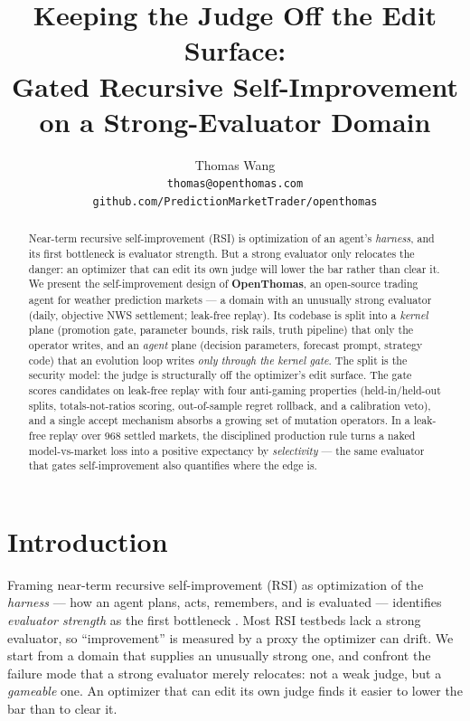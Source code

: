 \documentclass{article}
\title{Keeping the Judge Off the Edit Surface:\\ Gated Recursive
Self-Improvement on a Strong-Evaluator Domain}
\author{%
  Thomas Wang \\
  \texttt{thomas@openthomas.com} \\
  \texttt{github.com/PredictionMarketTrader/openthomas}
}
\begin{document}
\maketitle

\begin{abstract}
Near-term recursive self-improvement (RSI) is optimization of an agent's
\emph{harness}, and its first bottleneck is evaluator strength. But a strong
evaluator only relocates the danger: an optimizer that can edit its own judge
will lower the bar rather than clear it. We present the self-improvement design
of \textbf{OpenThomas}, an open-source trading agent for weather prediction
markets --- a domain with an unusually strong evaluator (daily, objective NWS
settlement; leak-free replay). Its codebase is split into a \emph{kernel} plane
(promotion gate, parameter bounds, risk rails, truth pipeline) that only the
operator writes, and an \emph{agent} plane (decision parameters, forecast
prompt, strategy code) that an evolution loop writes \emph{only through the
kernel gate}. The split is the security model: the judge is structurally off the
optimizer's edit surface. The gate scores candidates on leak-free replay with
four anti-gaming properties (held-in/held-out splits, totals-not-ratios scoring,
out-of-sample regret rollback, and a calibration veto), and a single accept
mechanism absorbs a growing set of mutation operators. In a leak-free replay
over 968 settled markets, the disciplined production rule turns a naked
model-vs-market loss into a positive expectancy by \emph{selectivity} --- the
same evaluator that gates self-improvement also quantifies where the edge is.
\end{abstract}

\section{Introduction}

Framing near-term recursive self-improvement (RSI) as optimization of the
\emph{harness} --- how an agent plans, acts, remembers, and is evaluated ---
identifies \emph{evaluator strength} as the first bottleneck \cite{harness}. Most
RSI testbeds lack a strong evaluator, so ``improvement'' is measured by a proxy
the optimizer can drift. We start from a domain that supplies an unusually strong
one, and confront the failure mode that a strong evaluator merely relocates: not
a weak judge, but a \emph{gameable} one. An optimizer that can edit its own judge
finds it easier to lower the bar than to clear it.
\end{document}
